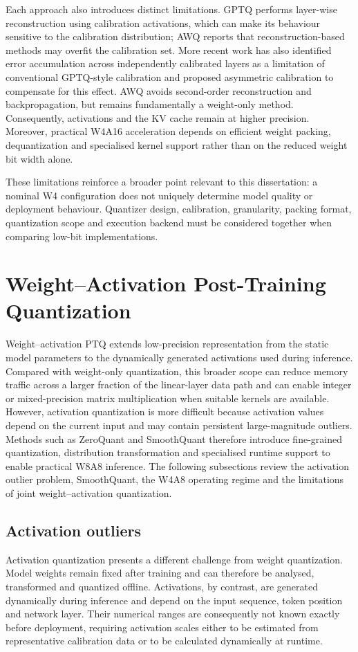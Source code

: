 Each approach also introduces distinct limitations. GPTQ performs
layer-wise reconstruction using calibration activations, which can make
its behaviour sensitive to the calibration distribution; AWQ reports
that reconstruction-based methods may overfit the calibration set. More recent work has
also identified error accumulation across independently calibrated
layers as a limitation of conventional GPTQ-style calibration and
proposed asymmetric calibration to compensate for this effect\cite{li2025gptaqefficientfinetuningfreequantization}. AWQ avoids second-order reconstruction and
backpropagation, but remains fundamentally a weight-only method.
Consequently, activations and the KV cache remain at higher precision.
Moreover, practical W4A16 acceleration depends on efficient weight
packing, dequantization and specialised kernel support rather than on
the reduced weight bit width alone.

These limitations reinforce a broader point relevant to this
dissertation: a nominal W4 configuration does not uniquely determine
model quality or deployment behaviour. Quantizer design, calibration,
granularity, packing format, quantization scope and execution backend
must be considered together when comparing low-bit implementations\cite{park2024lutgemmquantizedmatrixmultiplication}.

\section{Weight--Activation Post-Training Quantization}

Weight--activation {PTQ} extends low-precision representation from
the static model parameters to the dynamically generated activations
used during inference. Compared with weight-only quantization, this
broader scope can reduce memory traffic across a larger fraction of the
linear-layer data path and can enable integer or mixed-precision matrix
multiplication when suitable kernels are available. However, activation
quantization is more difficult because activation values depend on the
current input and may contain persistent large-magnitude outliers.
Methods such as ZeroQuant and SmoothQuant therefore introduce
fine-grained quantization, distribution transformation and specialised
runtime support to enable practical W8A8 inference. The following subsections review the activation outlier problem, SmoothQuant, the W4A8 operating regime and the
limitations of joint weight--activation quantization.

\subsection{Activation outliers}
Activation quantization presents a different challenge from weight
quantization. Model weights remain fixed after training and can
therefore be analysed, transformed and quantized offline. Activations,
by contrast, are generated dynamically during inference and depend on
the input sequence, token position and network layer. Their numerical
ranges are consequently not known exactly before deployment, requiring
activation scales either to be estimated from representative calibration
data or to be calculated dynamically at runtime.

